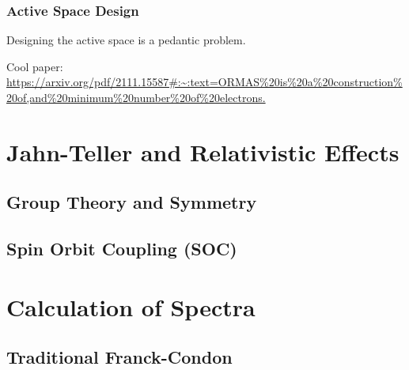         \cleardoublepage

        \subsubsection{Active Space Design}
        Designing the active space is a pedantic problem.
        
        Cool paper: \url{https://arxiv.org/pdf/2111.15587#:~:text=ORMAS%20is%20a%20construction%20of,and%20minimum%20number%20of%20electrons.}




    
\section{Jahn-Teller and Relativistic Effects}

    \subsection{Group Theory and Symmetry}

    \subsection{Spin Orbit Coupling (SOC)}


\section{Calculation of Spectra}
    \subsection{Traditional Franck-Condon}
    
